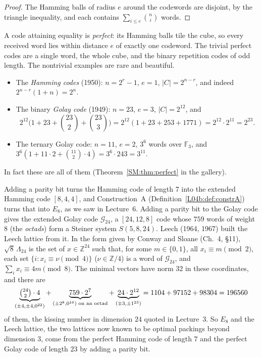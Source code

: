 \documentclass[11pt,openany]{book}
\theoremstyle{plain}
\theoremstyle{definition}
\theoremstyle{remark}
\newcommand{\Z}{\mathbb{Z}}
\newcommand{\abs}[1]{\left\lvert #1 \right\rvert}
\begin{document}
\begin{proof}
The Hamming balls of radius $e$ around the codewords are disjoint, by the triangle inequality, and each
contains $\sum_{i\le e}\binom ni$ words.
\end{proof}

A code attaining equality is \emph{perfect}: its Hamming balls tile the cube, so every received word lies
within distance $e$ of exactly one codeword. The trivial perfect codes are a single word, the whole cube, and the
binary repetition codes of odd length. The nontrivial examples are rare and beautiful.
\begin{itemize}[nosep]
\item The \emph{Hamming codes} (1950): $n=2^r-1$, $e=1$, $\abs C=2^{n-r}$, and indeed
  $2^{n-r}(1+n)=2^n$.
\item The binary \emph{Golay code} (1949): $n=23$, $e=3$, $\abs C=2^{12}$, and
  \[
    2^{12}\Big(1+23+\binom{23}2+\binom{23}3\Big)=2^{12}(1+23+253+1771)=2^{12}\cdot2^{11}=2^{23}.
  \]
\item The ternary Golay code: $n=11$, $e=2$, $3^6$ words over $\mathbb F_3$, and
  $3^6(1+11\cdot2+\binom{11}2\cdot4)=3^6\cdot243=3^{11}$.
\end{itemize}
In fact these are all of them (Theorem~\ref{SM:thm:perfect} in the gallery).

Adding a parity bit turns the Hamming code of length $7$ into the extended Hamming code $[8,4,4]$, and
Construction~A (Definition~\ref{L04b:def:constrA}) turns that into $E_8$, as we saw in Lecture~6. Adding a
parity bit to the Golay code gives the extended Golay code $\mathcal G_{24}$, a $[24,12,8]$ code whose
$759$ words of weight $8$ (the \emph{octads}) form a Steiner system $S(5,8,24)$. Leech (1964, 1967) built
the Leech lattice from it. In the form given by Conway and Sloane (Ch.~4, \S11), $\sqrt8\,\Lambda_{24}$ is the set
of $x\in\Z^{24}$ such that, for some $m\in\{0,1\}$, all $x_i\equiv m\pmod2$, each set
$\{i:x_i\equiv\nu\pmod4\}$ ($\nu\in\Z/4$) is a word of $\mathcal G_{24}$, and $\sum_ix_i\equiv4m\pmod8$.
The minimal vectors have norm $32$ in these coordinates, and there are
\[
  \underbrace{\tbinom{24}2\cdot4}_{(\pm4,\pm4,0^{22})}+\underbrace{759\cdot2^7}_{(\pm2^8,0^{16})\text{ on an octad}}+\underbrace{24\cdot2^{12}}_{(\mp3,\pm1^{23})}
  =1104+97152+98304=196560
\]
of them, the kissing number in dimension $24$ quoted in Lecture~3. So $E_8$ and the Leech lattice, the two lattices now known to be optimal packings beyond dimension $3$,
come from the perfect Hamming code of length $7$ and the perfect Golay code of length $23$ by adding a
parity bit.
\end{document}

